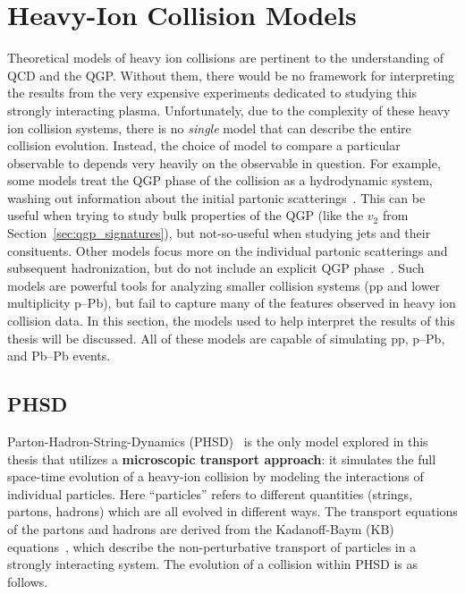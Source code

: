\section{Heavy-Ion Collision Models}
\label{sec:models}

Theoretical models of heavy ion collisions are pertinent to the understanding of QCD and the QGP. Without them, there would be no framework for interpreting the results from the very expensive experiments dedicated to studying this strongly interacting plasma. Unfortunately, due to the complexity of these heavy ion collision systems, there is no \textit{single} model that can describe the entire collision evolution. Instead, the choice of model to compare a particular observable to depends very heavily on the observable in question. For example, some models treat the QGP phase of the collision as a hydrodynamic system, washing out information about the initial partonic scatterings~\cite{EPOS}. This can be useful when trying to study bulk properties of the QGP (like the $v_2$ from Section~\ref{sec:qgp_signatures}), but not-so-useful when studying jets and their consituents. Other models focus more on the individual partonic scatterings and subsequent hadronization, but do not include an explicit QGP phase~\cite{Pythia, DPMJet}. Such models are powerful tools for analyzing smaller collision systems (pp and lower multiplicity p--Pb), but fail to capture many of the features observed in heavy ion collision data. In this section, the models used to help interpret the results of this thesis will be discussed. All of these models are capable of simulating pp, p--Pb, and Pb--Pb events.

\subsection{PHSD}
Parton-Hadron-String-Dynamics (PHSD)~\cite{PHSD1, PHSD2} is the only model explored in this thesis that utilizes a \textbf{microscopic transport approach}: it simulates the full space-time evolution of a heavy-ion collision by modeling the interactions of individual particles. Here ``particles'' refers to different quantities (strings, partons, hadrons) which are all evolved in different ways. The transport equations of the partons and hadrons are derived from the Kadanoff-Baym (KB) equations~\cite{KBEq}, which describe the non-perturbative transport of particles in a strongly interacting system. The evolution of a collision within PHSD is as follows.

